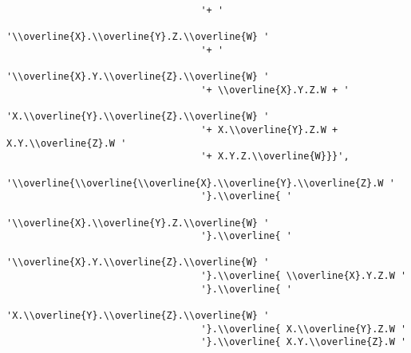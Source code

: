 \begin{verbatim}
                                  '+ '
                                  '\\overline{X}.\\overline{Y}.Z.\\overline{W} '
                                  '+ '
                                  '\\overline{X}.Y.\\overline{Z}.\\overline{W} '
                                  '+ \\overline{X}.Y.Z.W + '
                                  'X.\\overline{Y}.\\overline{Z}.\\overline{W} '
                                  '+ X.\\overline{Y}.Z.W + X.Y.\\overline{Z}.W '
                                  '+ X.Y.Z.\\overline{W}}}',
                                  '\\overline{\\overline{\\overline{X}.\\overline{Y}.\\overline{Z}.W '
                                  '}.\\overline{ '
                                  '\\overline{X}.\\overline{Y}.Z.\\overline{W} '
                                  '}.\\overline{ '
                                  '\\overline{X}.Y.\\overline{Z}.\\overline{W} '
                                  '}.\\overline{ \\overline{X}.Y.Z.W '
                                  '}.\\overline{ '
                                  'X.\\overline{Y}.\\overline{Z}.\\overline{W} '
                                  '}.\\overline{ X.\\overline{Y}.Z.W '
                                  '}.\\overline{ X.Y.\\overline{Z}.W '

\end{verbatim}
